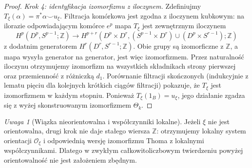 \documentclass[11pt,a4paper,oneside]{report}
\newcommand{\Z}{\mathbb{Z}}
\theoremstyle{plain}
\theoremstyle{definition}
\theoremstyle{remark}
\newtheorem{uwaga}[twierdzenie]{Uwaga}
\begin{document}
\begin{proof}
\emph{Krok 4: identyfikacja izomorfizmu z iloczynem.}
Zdefiniujmy $T_\xi(\alpha)=\pi^*\alpha\smile u_\xi$.
Filtracja komórkowa jest zgodna z iloczynem kubkowym:
na ilorazie odpowiadającym komórce $e^p$ mapa
$T_\xi$ jest zewnętrznym iloczynem
\[
H^p(D^p,S^{p-1};\Z)\longrightarrow
H^{p+r}(D^p\times D^r,
 (S^{p-1}\times D^r)\cup(D^p\times S^{r-1});\Z)
\]
z dodatnim generatorem $H^r(D^r,S^{r-1};\Z)$.
Obie grupy są izomorficzne z $\Z$, a mapa wysyła
generator na generator, jest więc izomorfizmem.
Przez naturalność iloczynu otrzymujemy izomorfizm
na wszystkich składnikach strony pierwszej oraz
przemienność z różniczką $d_1$.
Porównanie filtracji skończonych (indukcyjnie z lematu
pięciu dla kolejnych krótkich ciągów filtracji)
pokazuje, że $T_\xi$ jest izomorfizmem w każdym stopniu.
Ponieważ $T_\xi(1_B)=u_\xi$, jego działanie zgadza się
z wyżej skonstruowanym izomorfizmem $\Theta_k$.
\end{proof}
\begin{uwaga}[Wiązka nieorientowalna i współczynniki lokalne]
Jeżeli $\xi$ nie jest orientowalna, drugi krok nie daje
stałego wiersza $\Z$: otrzymujemy lokalny system orientacji
$\mathcal O_\xi$ i odpowiednią wersję izomorfizmu Thoma
z lokalnymi współczynnikami. Dlatego w zwykłym
całkowitoliczbowym twierdzeniu powyżej orientowalność
nie jest założeniem zbędnym.
\end{uwaga}
\end{document}
